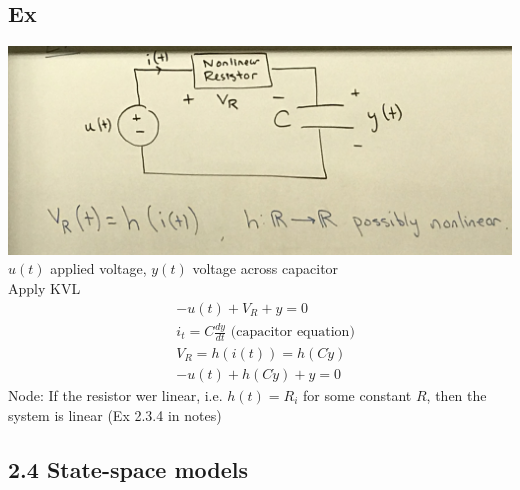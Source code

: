 \documentclass[12pt, a4paper]{article}
\begin{document}
\subsection*{Ex}
\includegraphics[scale=0.1]{images/EX2_1_2.jpg}\\
$u(t)$ applied voltage, $y(t)$ voltage across capacitor\\
Apply KVL 
\begin{align*}
  &-u(t)+V_R+y=0\\
  &i_t=C\frac{dy}{dt} \text{ (capacitor equation)}\\
  &V_R=h(i(t))=h(C\dot y)\\
  &-u(t)+h(C\dot y)+y=0
\end{align*}
Node: If the resistor wer linear, i.e. $h(t)=R_i$ for some constant $R$, then the system is linear (Ex 2.3.4 in notes)
\subsection*{2.4 State-space models}
\end{document}
